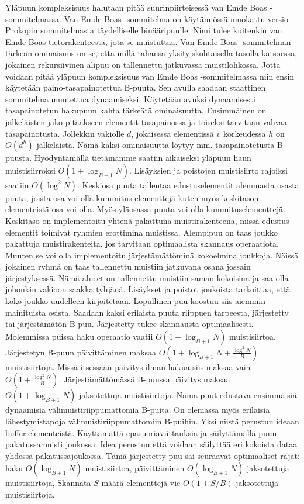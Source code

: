 \documentclass[finnish]{tktltiki2}
\theoremstyle{definition}
\theoremstyle{remark}
\begin{document}
\newline \indent Yläpuun kompleksisuus halutaan pitää suurinpiirteisessä van Emde
Boas -sommitelmassa. Van Emde Boas -sommitelma on käytännössä muokattu versio
Prokopin sommitelmasta täydelliselle binääripuulle. Nimi tulee kuitenkin van
Emde Boas tietorakenteesta, jota se muistuttaa. Van Emde Boas -sommitelman
tärkeän ominaisuus on se, että millä tahansa yksityiskohtaisella tasolla
katsoessa, jokainen rekursiivinen alipuu on tallennettu jatkuvassa
muistilohkossa. Jotta voidaan pitää yläpuun kompleksisuus van Emde Boas
-sommitelmassa niin ensin käytetään paino-tasapainotettua B-puuta. Sen avulla
saadaan staattinen sommitelma muutettua dynaamiseksi. Käytetään avuksi dynaamisesti
tasapainotetun hakupuun kahta tärkeätä ominaisuutta. Ensimmäinen on
jälkeläisten jako pitääkseen elementit tasapainossa ja toiseksi tarvitaan
vahvaa tasapainotusta. Jollekkin vakiolle \(d\), jokaisessa elementissä \(v\)
korkeudessa \(h\) on \(O(d^h)\) jälkeläistä. Nämä kaksi ominaisuutta
löytyy mm. tasapainotetusta B-puusta. Hyödyntämällä tietämämme saatiin aikaiseksi
yläpuun haun muistisiirroksi \(O(1+\log_{B+1}N)\). Lisäyksien ja poistojen muistisiirto rajoiksi
saatiin \(O(\log^2N)\).
\newline \indent Keskiosa puuta tallentaa edustuselementit alemmasta osasta puuta, joista osa
voi olla kummitus elementtejä kuten myös keskitason elementeistä osa voi olla.
Myös yläosassa puuta voi olla kummituselementtejä. Keskitaso on implementoitu
yhtenä pakattuna muistirakenteena, missä edustus elementit toimivat ryhmien
erottimina muistissa. Alempipuu on taas joukko pakattuja muistirakenteita, jos
tarvitaan optimaalista skannaus operaatiota. Muuten se voi olla implementoitu
järjestämättöminä kokoelmina joukkoja. Näissä jokainen ryhmä on taas
tallennettu muistiin jatkuvana osana jossain järjestyksessä. Nämä alueet on
tallennettu muistiin saman kokoisina ja saa olla johonkin vakioon saakka tyhjänä.
Lisäykset ja poistot joukoista tarkoittaa, että koko joukko uudelleen
kirjoitetaan.
\newline \indent Lopullinen puu koostuu siis aiemmin mainituista osista. Saadaan
kaksi erilaista puuta riippuen tarpeesta, järjestetty tai järjestämätön B-puu.
Järjestetty tukee skannausta optimaalisesti. Molemmissa puissa haku operaatio vaatii
\(O(1+\log_{B+1}N)\) muistisiirtoa. Järjestetyn B-puun päivittäminen maksaa
\(O(1+\log_{B+1}N+\tfrac{\log^2 N}{B})\) muistisiirtoja. Missä itsessään päivitys
ilman hakua siis maksaa vain \(O(1+\tfrac{\log^2 N}{B})\). Järjestämättömässä B-puussa
päivitys maksaa \(O(1+\log_{B+1}N)\) jaksotettuja muistisiirtoja. Nämä puut edustava ensimmäisiä dynaamisia
välimuistiriippumattomia B-puita.
\newline \indent On olemassa myös erilaisia lähestymistapoja välimuistiriippumattomiin B-puihin.
Yksi niistä perustuu ideaan bufferielementeistä. Käyttämättä epäsuoriaviittauksia
ja säilyttämällä puun pakatussamuisti joukossa. Idea perustuu että voidaan säilyttää
eri kokoista dataa yhdessä pakatussajoukossa. Tämä järjestetty puu sai seuraavat optimaaliset rajat:
haku \(O(\log_{B+1}N)\) muistisiirtoa, päivittäminen \(O(\log_{B+1}N)\) jaksotettuja muistisiirtoja, Skannata \(S\) määrä elementtejä
vie \(O(1+S/B)\) jaksotettuja muistisiirtoja.
\end{document}
